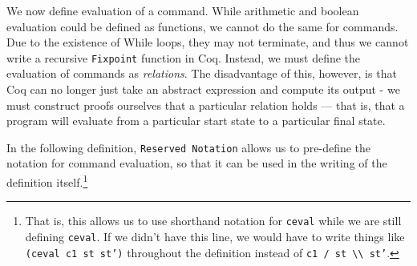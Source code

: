 \documentclass[12pt,notitlepage]{report}
\theoremstyle{plain}
\theoremstyle{definition}
\numberwithin{equation}{section}
\begin{document}
We now define evaluation of a command.  While arithmetic and boolean evaluation could be defined as functions, we cannot do the same for commands.  Due to the existence of While loops, they may not terminate, and thus we cannot write a recursive \texttt{Fixpoint} function in Coq.  Instead, we must define the evaluation of commands as \emph{relations}.  The disadvantage of this, however, is that Coq can no longer just take an abstract expression and compute its output - we must construct proofs ourselves that a particular relation holds --- that is, that a program will evaluate from a particular start state to a particular final state.
\par In the following definition, \texttt{Reserved Notation} allows us to pre-define the notation for command evaluation, so that it can be used in the writing of the definition itself.\footnote{That is, this allows us to use shorthand notation for \texttt{ceval} while we are still defining \texttt{ceval}.  If we didn't have this line, we would have to write things like \texttt{(ceval c1 st st')} throughout the definition instead of \texttt{c1 / st  \textbackslash\textbackslash\ st'}.}
\end{document}
